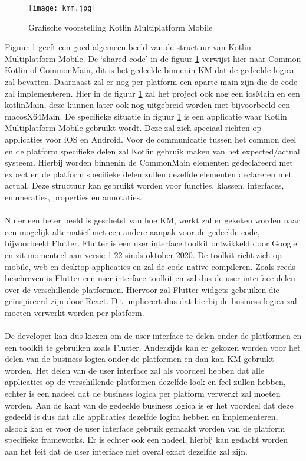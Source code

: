 \begin{figure}
    \texttt{[image: kmm.jpg]}
    \caption{Grafische voorstelling Kotlin Multiplatform Mobile \autocite{KotlinKMM}}
    \label{fig:kmm}
\end{figure}

Figuur \ref{fig:kmm} geeft een goed algemeen beeld van de structuur van Kotlin Multiplatform Mobile. De ‘shared code’ in de figuur \ref{fig:kmm} verwijst hier naar Common Kotlin of CommonMain, dit is het gedeelde binnenin KM dat de gedeelde logica zal bevatten. Daarnaast zal er nog per platform een aparte main zijn die de code zal implementeren. Hier in de figuur \ref{fig:kmm} zal het project ook nog een iosMain en een kotlinMain, deze kunnen later ook nog uitgebreid worden met bijvoorbeeld een macosX64Main. De specifieke situatie in figuur \ref{fig:kmm} is een applicatie waar Kotlin Multiplatform Mobile gebruikt wordt. Deze zal zich speciaal richten op applicaties voor iOS en Android.
Voor de communicatie tussen het common deel en de platform specifieke delen zal Kotlin gebruik maken van het expected/actual systeem. Hierbij worden binnenin de CommonMain elementen gedeclareerd met expect en de platform specifieke delen zullen dezelfde elementen declareren met actual. Deze structuur kan gebruikt worden voor functies, klassen, interfaces, enumeraties, properties en annotaties. 
\\ \\
Nu er een beter beeld is geschetst van hoe KM, werkt zal er gekeken worden naar een mogelijk alternatief met een andere aanpak voor de gedeelde code, bijvoorbeeld Flutter. Flutter is een user interface toolkit ontwikkeld door Google en zit momenteel aan versie 1.22 sinds oktober 2020.\autocite{Sells2020} De toolkit richt zich op mobile, web en desktop applicaties en zal de code native compileren. Zoals reeds beschreven is Flutter een user interface toolkit en zal dus de user interface delen over de verschillende platformen. Hiervoor zal Flutter widgets gebruiken die geïnspireerd zijn door React.\autocite{FlutterWidgets} Dit impliceert dus dat hierbij de business logica zal moeten verwerkt worden per platform.
\\ \\
De developer kan dus kiezen om de user interface te delen onder de platformen en een toolkit te gebruiken zoals Flutter. Anderzijds kan er gekozen worden voor het delen van de business logica onder de platformen en dan kan KM gebruikt worden. Het delen van de user interface zal als voordeel hebben dat alle applicaties op de verschillende platformen dezelfde look en feel zullen hebben, echter is een nadeel dat de business logica per platform verwerkt zal moeten worden. Aan de kant van de gedeelde business logica is er het voordeel dat deze gedeeld is dus dat alle applicaties dezelfde logica hebben en implementeren, alsook kan er voor de user interface gebruik gemaakt worden van de platform specifieke frameworks. Er is echter ook een nadeel, hierbij kan gedacht worden aan het feit dat de user interface niet overal exact dezelfde zal zijn. 


